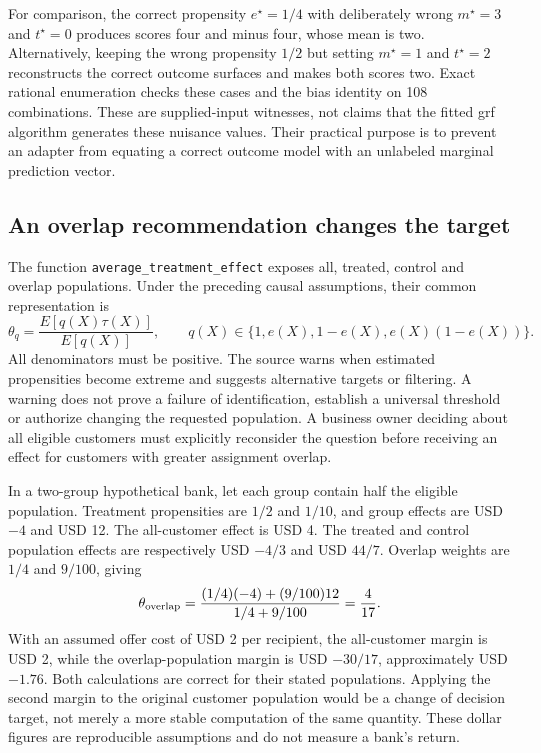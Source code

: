 For comparison, the correct propensity $e^\star=1/4$ with deliberately wrong $m^\star=3$ and $t^\star=0$ produces scores four and minus four, whose mean is two. Alternatively, keeping the wrong propensity $1/2$ but setting $m^\star=1$ and $t^\star=2$ reconstructs the correct outcome surfaces and makes both scores two. Exact rational enumeration checks these cases and the bias identity on 108 combinations. These are supplied-input witnesses, not claims that the fitted grf algorithm generates these nuisance values. Their practical purpose is to prevent an adapter from equating a correct outcome model with an unlabeled marginal prediction vector.\citep{exec21_grf_reference}

\subsection{An overlap recommendation changes the target}
\label{exec21:grfr-target}
The function \texttt{average\_treatment\_effect} exposes all, treated, control and overlap populations. Under the preceding causal assumptions, their common representation is
\begin{equation}
 \theta_q=\frac{E[q(X)\tau(X)]}{E[q(X)]},\qquad
 q(X)\in\{1,e(X),1-e(X),e(X)(1-e(X))\}.
 \label{exec21:grfr-populations}
\end{equation}
All denominators must be positive. The source warns when estimated propensities become extreme and suggests alternative targets or filtering. A warning does not prove a failure of identification, establish a universal threshold or authorize changing the requested population. A business owner deciding about all eligible customers must explicitly reconsider the question before receiving an effect for customers with greater assignment overlap.\citep{exec21_grf_reuse}

In a two-group hypothetical bank, let each group contain half the eligible population. Treatment propensities are $1/2$ and $1/10$, and group effects are USD $-4$ and USD 12. The all-customer effect is USD 4. The treated and control population effects are respectively USD $-4/3$ and USD $44/7$. Overlap weights are $1/4$ and $9/100$, giving
\begin{equation}
 \theta_{\rm overlap}
 =\frac{(1/4)(-4)+(9/100)12}{1/4+9/100}
 =\frac{4}{17}.
 \label{exec21:grfr-overlap}
\end{equation}
With an assumed offer cost of USD 2 per recipient, the all-customer margin is USD 2, while the overlap-population margin is USD $-30/17$, approximately USD $-1.76$. Both calculations are correct for their stated populations. Applying the second margin to the original customer population would be a change of decision target, not merely a more stable computation of the same quantity. These dollar figures are reproducible assumptions and do not measure a bank's return.\citep{exec21_grf_reference}

